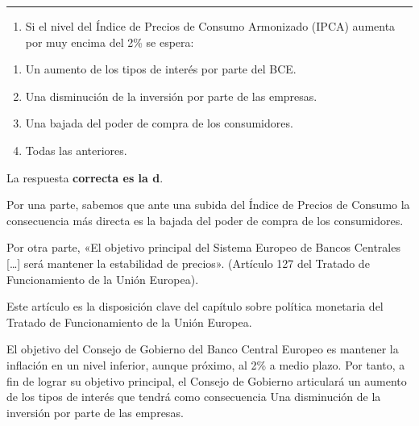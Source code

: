 \documentclass[
  letterpaper,
  DIV=11,
  numbers=noendperiod]{scrreprt}
\providecommand{\tightlist}{%
  \setlength{\itemsep}{0pt}\setlength{\parskip}{0pt}}\usepackage{longtable,booktabs,array}
\begin{document}
\begin{center}\rule{0.5\linewidth}{0.5pt}\end{center}

\begin{enumerate}
\def\labelenumi{\arabic{enumi}.}
\setcounter{enumi}{47}
\tightlist
\item
  Si el nivel del Índice de Precios de Consumo Armonizado (IPCA) aumenta
  por muy encima del 2\% se espera:
\end{enumerate}

\begin{enumerate}
\def\labelenumi{\alph{enumi})}
\item
  Un aumento de los tipos de interés por parte del BCE.
\item
  Una disminución de la inversión por parte de las empresas.
\item
  Una bajada del poder de compra de los consumidores.
\item
  Todas las anteriores.
\end{enumerate}

\begin{tcolorbox}[enhanced jigsaw, left=2mm, opacityback=0, colback=white, breakable, arc=.35mm, bottomrule=.15mm, rightrule=.15mm, toprule=.15mm, leftrule=.75mm, colframe=quarto-callout-tip-color-frame]
\begin{minipage}[t]{5.5mm}
\textcolor{quarto-callout-tip-color}{\faLightbulb}
\end{minipage}%
\begin{minipage}[t]{\textwidth - 5.5mm}

La respuesta \textbf{correcta es la d}.

Por una parte, sabemos que ante una subida del Índice de Precios de
Consumo la consecuencia más directa es la bajada del poder de compra de
los consumidores.

Por otra parte, «El objetivo principal del Sistema Europeo de Bancos
Centrales {[}\ldots{]} será mantener la estabilidad de precios».
(Artículo 127 del Tratado de Funcionamiento de la Unión Europea).

Este artículo es la disposición clave del capítulo sobre política
monetaria del Tratado de Funcionamiento de la Unión Europea.

El objetivo del Consejo de Gobierno del Banco Central Europeo es
mantener la inflación en un nivel inferior, aunque próximo, al 2\% a
medio plazo. Por tanto, a fin de lograr su objetivo principal, el
Consejo de Gobierno articulará un aumento de los tipos de interés que
tendrá como consecuencia Una disminución de la inversión por parte de
las empresas.

\end{minipage}%
\end{tcolorbox}
\end{document}
